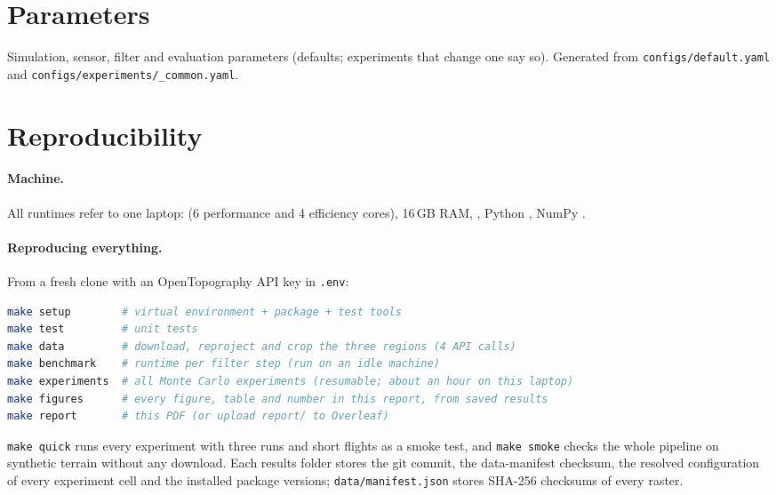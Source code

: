 \section{Parameters}\label{app:params}

\begin{table}[H]
  \centering\small
  \caption{Simulation, sensor, filter and evaluation parameters (defaults; experiments that
    change one say so). Generated from \texttt{configs/default.yaml} and
    \texttt{configs/experiments/\_common.yaml}.}\label{tab:params}
  
\end{table}

\section{Reproducibility}\label{app:repro}

\paragraph{Machine.} All runtimes refer to one laptop: \MachineCpu{} (6 performance and 4
efficiency cores), 16\,GB RAM, \MachineOs{}, Python \MachinePython{}, NumPy \MachineNumpy{}.

\paragraph{Reproducing everything.} From a fresh clone with an OpenTopography API key in
\texttt{.env}:
\begin{lstlisting}[language=bash,numbers=none]
make setup        # virtual environment + package + test tools
make test         # unit tests
make data         # download, reproject and crop the three regions (4 API calls)
make benchmark    # runtime per filter step (run on an idle machine)
make experiments  # all Monte Carlo experiments (resumable; about an hour on this laptop)
make figures      # every figure, table and number in this report, from saved results
make report       # this PDF (or upload report/ to Overleaf)
\end{lstlisting}
\texttt{make quick} runs every experiment with three runs and short flights as a smoke test, and
\texttt{make smoke} checks the whole pipeline on synthetic terrain without any download.
Each results folder stores the git commit, the data-manifest checksum, the resolved configuration
of every experiment cell and the installed package versions; \texttt{data/manifest.json} stores
SHA-256 checksums of every raster.

